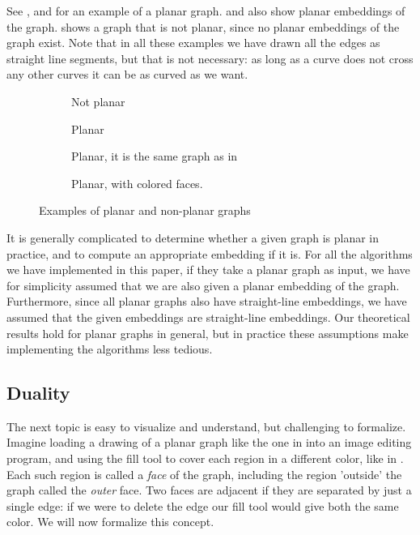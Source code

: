 See ,  and  for an example of a planar graph.  and  also show planar embeddings of the graph.  shows a graph that is not planar, since no planar embeddings of the graph exist. Note that in all these examples we have drawn all the edges as straight line segments, but that is not necessary: as long as a curve does not cross any other curves it can be as curved as we want.

\begin{figure}
    \centering
    \begin{subfigure}{.23\textwidth}
        \centering
        
        \caption{Not planar}
        \label{subfigure:k33}
    \end{subfigure}\hfill%
    \begin{subfigure}{.23\textwidth}
        \centering
        
        \caption{Planar}
        \label{subfigure:k4-a}
    \end{subfigure}\hfill%
    \begin{subfigure}{.23\textwidth}
        \centering
        
        \caption{Planar, it is the same graph as in }
        \label{subfigure:k4-b}
    \end{subfigure}\hfill%
    \begin{subfigure}{.23\textwidth}
        \centering
        
        \caption{Planar, with colored faces.}
        \label{subfigure:k4-c}
    \end{subfigure}
    \caption{Examples of planar and non-planar graphs}
\end{figure}

It is generally complicated to determine whether a given graph is planar in practice, and to compute an appropriate embedding if it is. For all the algorithms we have implemented in this paper, if they take a planar graph as input, we have for simplicity assumed that we are also given a planar embedding of the graph. Furthermore, since all planar graphs also have straight-line embeddings, we have assumed that the given embeddings are straight-line embeddings. Our theoretical results hold for planar graphs in general, but in practice these assumptions make implementing the algorithms less tedious.

\subsection{Duality}
The next topic is easy to visualize and understand, but challenging to formalize. Imagine loading a drawing of a planar graph like the one in  into an image editing program, and using the fill tool to cover each region in a different color, like in . Each such region is called a \emph{face} of the graph, including the region 'outside' the graph called the \emph{outer} face. Two faces are adjacent if they are separated by just a single edge: if we were to delete the edge our fill tool would give both the same color. We will now formalize this concept.

